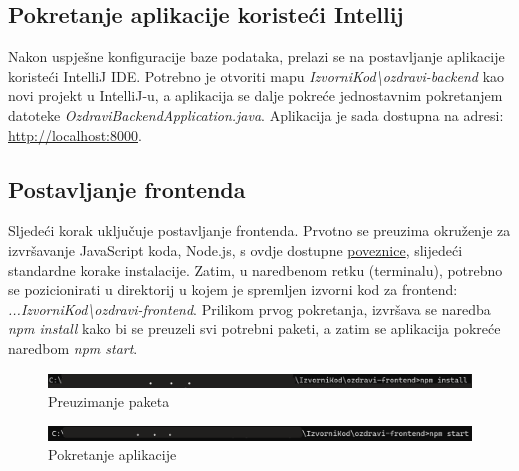 	\subsection*{Pokretanje aplikacije koristeći Intellij}
	Nakon uspješne konfiguracije baze podataka, prelazi se na postavljanje aplikacije koristeći IntelliJ IDE. Potrebno je otvoriti mapu \textit{IzvorniKod\textbackslash ozdravi-backend} kao 
	novi projekt u IntelliJ-u, a aplikacija se dalje pokreće jednostavnim pokretanjem datoteke \textit{OzdraviBackendApplication.java}. Aplikacija je sada dostupna na adresi:
	\url{http://localhost:8000}.

	\subsection*{Postavljanje frontenda}
	Sljedeći korak uključuje postavljanje frontenda. Prvotno se preuzima okruženje za izvršavanje JavaScript koda, Node.js, s ovdje dostupne 
	\href{https://nodejs.org/en/download/}{poveznice}, slijedeći standardne korake instalacije. Zatim, u naredbenom retku (terminalu), potrebno se pozicionirati 
	u direktorij u kojem je spremljen izvorni kod za frontend: \textit{...IzvorniKod\textbackslash ozdravi-frontend}. Prilikom prvog pokretanja, izvršava se naredba \textit{npm install} kako bi se 
	preuzeli svi potrebni paketi, a zatim se aplikacija pokreće naredbom \textit{npm start}.
	\begin{figure}[H]
		\includegraphics[width=\textwidth]{slike/npmin.png} 
		\caption{Preuzimanje paketa} 
	\end{figure}
	\begin{figure}[H]
		\includegraphics[width=\textwidth]{slike/npmst.png} 
		\caption{Pokretanje aplikacije} 
	\end{figure}
	
